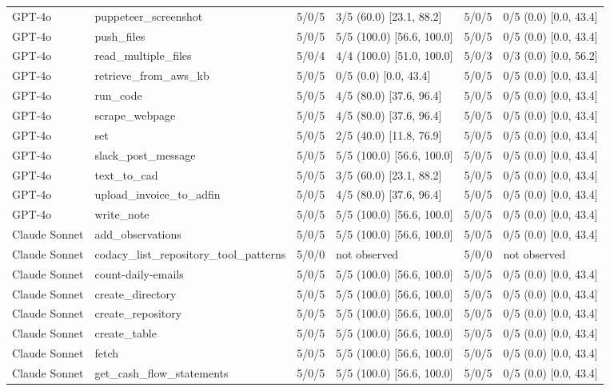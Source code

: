 \begin{center}
\begin{longtable}{@{}lp{}llll@{}}
GPT-4o & puppeteer\_screenshot & 5/0/5 & 3/5 (60.0) [23.1, 88.2] & 5/0/5 & 0/5 (0.0) [0.0, 43.4] \\
GPT-4o & push\_files & 5/0/5 & 5/5 (100.0) [56.6, 100.0] & 5/0/5 & 0/5 (0.0) [0.0, 43.4] \\
GPT-4o & read\_multiple\_files & 5/0/4 & 4/4 (100.0) [51.0, 100.0] & 5/0/3 & 0/3 (0.0) [0.0, 56.2] \\
GPT-4o & retrieve\_from\_aws\_kb & 5/0/5 & 0/5 (0.0) [0.0, 43.4] & 5/0/5 & 0/5 (0.0) [0.0, 43.4] \\
GPT-4o & run\_code & 5/0/5 & 4/5 (80.0) [37.6, 96.4] & 5/0/5 & 0/5 (0.0) [0.0, 43.4] \\
GPT-4o & scrape\_webpage & 5/0/5 & 4/5 (80.0) [37.6, 96.4] & 5/0/5 & 0/5 (0.0) [0.0, 43.4] \\
GPT-4o & set & 5/0/5 & 2/5 (40.0) [11.8, 76.9] & 5/0/5 & 0/5 (0.0) [0.0, 43.4] \\
GPT-4o & slack\_post\_message & 5/0/5 & 5/5 (100.0) [56.6, 100.0] & 5/0/5 & 0/5 (0.0) [0.0, 43.4] \\
GPT-4o & text\_to\_cad & 5/0/5 & 3/5 (60.0) [23.1, 88.2] & 5/0/5 & 0/5 (0.0) [0.0, 43.4] \\
GPT-4o & upload\_invoice\_to\_adfin & 5/0/5 & 4/5 (80.0) [37.6, 96.4] & 5/0/5 & 0/5 (0.0) [0.0, 43.4] \\
GPT-4o & write\_note & 5/0/5 & 5/5 (100.0) [56.6, 100.0] & 5/0/5 & 0/5 (0.0) [0.0, 43.4] \\
Claude Sonnet & add\_observations & 5/0/5 & 5/5 (100.0) [56.6, 100.0] & 5/0/5 & 0/5 (0.0) [0.0, 43.4] \\
Claude Sonnet & codacy\_list\_repository\_tool\_patterns & 5/0/0 & not observed & 5/0/0 & not observed \\
Claude Sonnet & count-daily-emails & 5/0/5 & 5/5 (100.0) [56.6, 100.0] & 5/0/5 & 0/5 (0.0) [0.0, 43.4] \\
Claude Sonnet & create\_directory & 5/0/5 & 5/5 (100.0) [56.6, 100.0] & 5/0/5 & 0/5 (0.0) [0.0, 43.4] \\
Claude Sonnet & create\_repository & 5/0/5 & 5/5 (100.0) [56.6, 100.0] & 5/0/5 & 0/5 (0.0) [0.0, 43.4] \\
Claude Sonnet & create\_table & 5/0/5 & 5/5 (100.0) [56.6, 100.0] & 5/0/5 & 0/5 (0.0) [0.0, 43.4] \\
Claude Sonnet & fetch & 5/0/5 & 5/5 (100.0) [56.6, 100.0] & 5/0/5 & 0/5 (0.0) [0.0, 43.4] \\
Claude Sonnet & get\_cash\_flow\_statements & 5/0/5 & 5/5 (100.0) [56.6, 100.0] & 5/0/5 & 0/5 (0.0) [0.0, 43.4] \\

\end{longtable}
\end{center}
